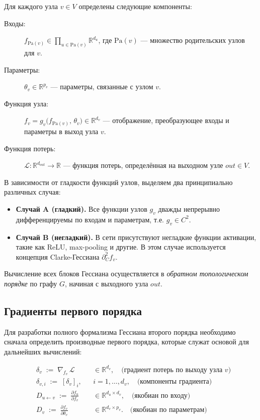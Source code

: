 \documentclass[11pt]{article}
\newcommand{\Pa}{\mathrm{Pa}} %
\begin{document}
Для каждого узла $v \in V$ определены следующие компоненты:
\begin{description}
  \item[Входы:] $f_{\Pa(v)}\in\prod_{u\in\Pa(v)}\mathbb{R}^{d_u}$, где $\Pa(v)$ — множество родительских узлов для $v$.
  \item[Параметры:] $\theta_v\in\mathbb{R}^{p_v}$ — параметры, связанные с узлом $v$.
  \item[Функция узла:] $f_v = g_v\bigl(f_{\Pa(v)},\,\theta_v\bigr)\in\mathbb{R}^{d_v}$ — отображение,
    преобразующее входы и параметры в выход узла $v$.
  \item[Функция потерь:] $\mathcal L:\mathbb{R}^{d_{out}}\to\mathbb{R}$ — функция потерь, определённая на
    выходном узле $out \in V$.
\end{description}

В зависимости от гладкости функций узлов, выделяем два принципиально различных случая:

\begin{itemize}
  \item \textbf{Случай A (гладкий).} Все функции узлов $g_v$ дважды непрерывно дифференцируемы по входам и
    параметрам, т.е. $g_v \in C^2$.
  \item \textbf{Случай B (негладкий).} В сети присутствуют негладкие функции активации, такие как ReLU,
    max-pooling и другие. В этом случае используется концепция Clarke-Гессиана $\partial_C^2 f_v$.
\end{itemize}

Вычисление всех блоков Гессиана осуществляется в \emph{обратном топологическом порядке} по графу $G$, начиная
с выходного узла $out$.

\subsection{Градиенты первого порядка}

Для разработки полного формализма Гессиана второго порядка необходимо сначала определить производные первого
порядка, которые служат основой для дальнейших вычислений:

\begin{align*}
  &\delta_v \;:=\; \nabla_{f_v}\,\mathcal L
  &&\in\mathbb{R}^{d_v}, \quad \text{(градиент потерь по выходу узла $v$)}
  \\[-2pt]
  &\delta_{v,i} \;:=\; [\delta_v]_i,
  &&i=1,\dots,d_v, \quad \text{(компоненты градиента)}
  \\[3pt]
  &D_{u\gets v}
  \;:=\;\frac{\partial f_u}{\partial f_v}
  &&\in\mathbb{R}^{d_u\times d_v}, \quad \text{(якобиан по входу)}
  \\[-2pt]
  &D_v
  \;:=\;\frac{\partial f_v}{\partial\theta_v}
  &&\in\mathbb{R}^{d_v\times p_v}. \quad \text{(якобиан по параметрам)}
\end{align*}
\end{document}
